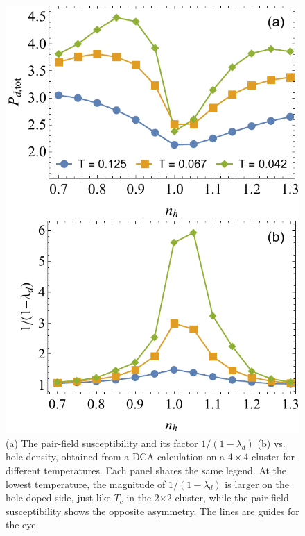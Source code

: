 \documentclass[reprint,nofootinbib,nobibnotes,amsmath,amssymb,aps,prb,floatfix]{revtex4-1}
\begin{document}
\begin{figure}[ht]
\includegraphics[width=0.8\linewidth]{./Figures/4by4asymmetry.pdf}
\caption{(a) The pair-field susceptibility and its factor $1/(1-\lambda_d)$  (b) vs. hole density, obtained from a DCA calculation on a $4\times 4$ cluster for different temperatures. Each panel shares the same legend. At the lowest temperature, the magnitude of $1/(1-\lambda_d)$ is larger on the hole-doped side, just like $T_c$ in the 2$\times$2 cluster, while the pair-field susceptibility shows the opposite asymmetry. The lines are guides for the eye.
}
\label{dopedepend4by4}
\end{figure}
\end{document}
